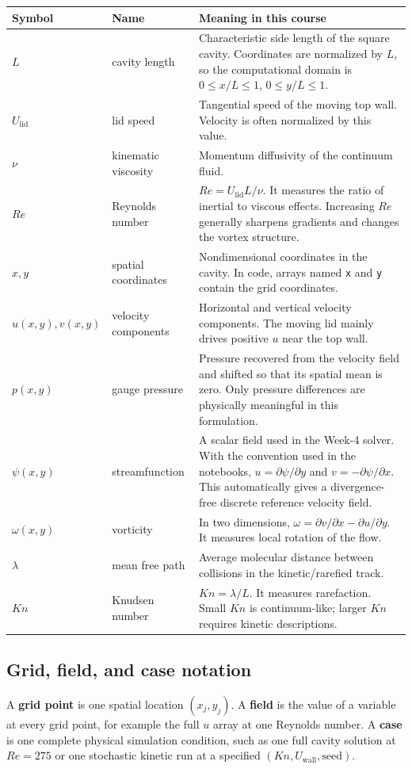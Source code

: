 \documentclass[11pt]{article}
\begin{document}
\begin{tabularx}{\textwidth}{@{}p{}p{}Y@{}}
\toprule
\textbf{Symbol} & \textbf{Name} & \textbf{Meaning in this course}\\
\midrule
$L$ & cavity length & Characteristic side length of the square cavity. Coordinates are normalized by $L$, so the computational domain is $0\le x/L\le1$, $0\le y/L\le1$.\\
$U_{\mathrm{lid}}$ & lid speed & Tangential speed of the moving top wall. Velocity is often normalized by this value.\\
$\nu$ & kinematic viscosity & Momentum diffusivity of the continuum fluid.\\
$Re$ & Reynolds number & $Re=U_{\mathrm{lid}}L/\nu$. It measures the ratio of inertial to viscous effects. Increasing $Re$ generally sharpens gradients and changes the vortex structure.\\
$x,y$ & spatial coordinates & Nondimensional coordinates in the cavity. In code, arrays named \texttt{x} and \texttt{y} contain the grid coordinates.\\
$u(x,y),v(x,y)$ & velocity components & Horizontal and vertical velocity components. The moving lid mainly drives positive $u$ near the top wall.\\
$p(x,y)$ & gauge pressure & Pressure recovered from the velocity field and shifted so that its spatial mean is zero. Only pressure differences are physically meaningful in this formulation.\\
$\psi(x,y)$ & streamfunction & A scalar field used in the Week-4 solver. With the convention used in the notebooks, $u=\partial\psi/\partial y$ and $v=-\partial\psi/\partial x$. This automatically gives a divergence-free discrete reference velocity field.\\
$\omega(x,y)$ & vorticity & In two dimensions, $\omega=\partial v/\partial x-\partial u/\partial y$. It measures local rotation of the flow.\\
$\lambda$ & mean free path & Average molecular distance between collisions in the kinetic/rarefied track.\\
$Kn$ & Knudsen number & $Kn=\lambda/L$. It measures rarefaction. Small $Kn$ is continuum-like; larger $Kn$ requires kinetic descriptions.\\
\bottomrule
\end{tabularx}

\subsection{Grid, field, and case notation}
A \textbf{grid point} is one spatial location $(x_j,y_j)$. A \textbf{field} is the value of a variable at every grid point, for example the full $u$ array at one Reynolds number. A \textbf{case} is one complete physical simulation condition, such as one full cavity solution at $Re=275$ or one stochastic kinetic run at a specified $(Kn,U_{\mathrm{wall}},\text{seed})$.
\end{document}
